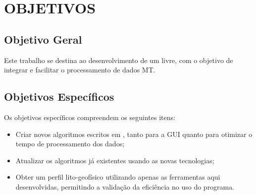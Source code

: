 \chapter{OBJETIVOS}

	\section{Objetivo Geral}
        Este trabalho se destina ao desenvolvimento de um  livre, com o objetivo de integrar e facilitar o processamento de dados MT.
    
    \section{Objetivos Específicos}
        
        Os objetivos específicos compreendem os seguintes itens:
        
        \begin{itemize}
            \item Criar novos algoritmos escritos em \Python, tanto para a GUI quanto para otimizar o tempo de processamento dos dados;
            \item Atualizar os algoritmos já existentes usando as novas tecnologias;
            \item Obter um perfil lito-geofísico utilizando apenas as ferramentas aqui desenvolvidas, permitindo a validação da eficiência no uso do programa.
        \end{itemize}
